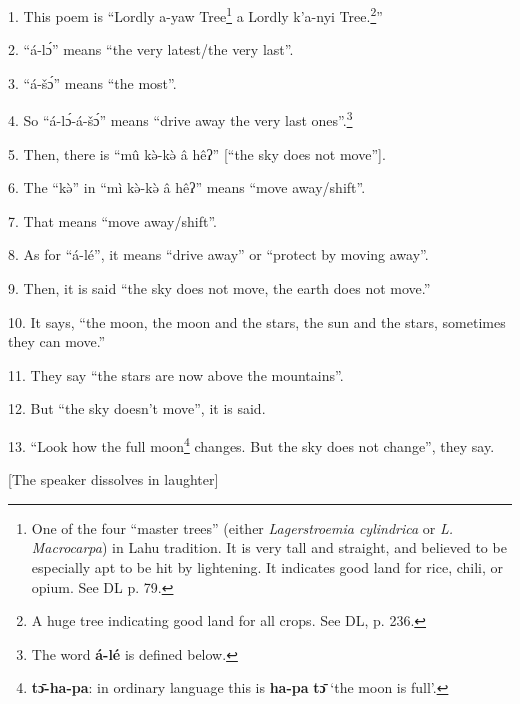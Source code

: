 \setcounter{footnote}{0}

1. This poem is ``Lordly a-yaw Tree\footnote{One of the four ``master trees'' (either \textit{Lagerstroemia cylindrica} or \textit{L. Macrocarpa}) in Lahu tradition. It is very tall and straight, and believed to be especially apt to be hit by lightening. It indicates good land for rice, chili, or opium. See DL p. 79.} a Lordly k'a-nyi Tree.\footnote{A huge tree indicating good land for all crops. See DL, p. 236.}''

2. ``á-lɔ́'' means ``the very latest/the very last''.

3. ``á-šɔ́'' means ``the most''.

4. So ``á-lɔ́-á-šɔ́'' means ``drive away the very last ones''.\footnote{The word \textbf{á-lé} is defined below.}

5. Then, there is ``mû kə̀-kə̀ â hêʔ'' [``the sky does not move''].

6. The ``kə̀'' in ``mì kə̀-kə̀ â hêʔ'' means ``move away/shift''.

7. That means ``move away/shift''.

8. As for ``á-lé'', it means ``drive away'' or ``protect by moving away''.

9. Then, it is said ``the sky does not move, the earth does not move.''

10. It says, ``the moon, the moon and the stars, the sun and the stars, sometimes
they can move.''

11. They say ``the stars are now above the mountains''.

12. But ``the sky doesn't move'', it is said.

13. ``Look how the full moon\footnote{\textbf{tɔ̄-ha-pa}: in ordinary language this is \textbf{ha-pa} \textbf{tɔ̄} `the moon is full'.} changes. But the sky does not change'', they say.

[The speaker dissolves in laughter]

